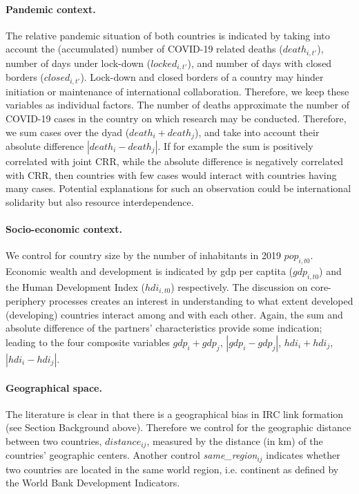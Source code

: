 \paragraph{Pandemic context.} The relative pandemic situation of both countries is indicated by taking into account the (accumulated) number of COVID-19 related deaths ($death_{i,t'}$),  number of days under lock-down ($locked_{i,t'}$), and number of days with closed borders ($closed_{i,t'}$). Lock-down and closed borders of a country may hinder initiation or maintenance of international collaboration. Therefore, we keep these variables as individual factors. The number of deaths approximate the number of COVID-19 cases in the country on which research may be conducted. Therefore, we sum cases over the dyad ($death_i + death_j$), and take into account their absolute difference $|death_i - death_j|$. If for example the sum is positively correlated with joint CRR, while the absolute difference is negatively correlated with CRR, then countries with few cases would interact with countries having many cases. Potential explanations for such an observation could be international solidarity but also resource interdependence. 

 
\paragraph{Socio-economic context.} We control for country size by the number of inhabitants in 2019 $pop_{i,t0}$. Economic wealth and development is indicated by gdp per captita ($gdp_{i,t0}$) and the Human Development Index ($hdi_{i,t0}$) respectively. The discussion on core-periphery processes creates an interest in understanding to what extent developed (developing) countries interact among and with each other. Again, the sum and absolute difference of the partners' characteristics provide some indication; leading to the four composite variables $gdp_i + gdp_j$, $|gdp_i - gdp_j|$, $hdi_i + hdi_j$, $|hdi_i - hdi_j|$.


\paragraph{Geographical space.} The literature is clear in that there is a geographical bias in IRC link formation (see Section Background above). Therefore we control for the geographic distance between two countries, $distance_{ij}$, measured by the distance (in km) of the countries' geographic centers. Another control \textit{same\_region}$_{ij}$ indicates whether two countries are located in the same world region, i.e. continent as defined by the World Bank Development Indicators.   



